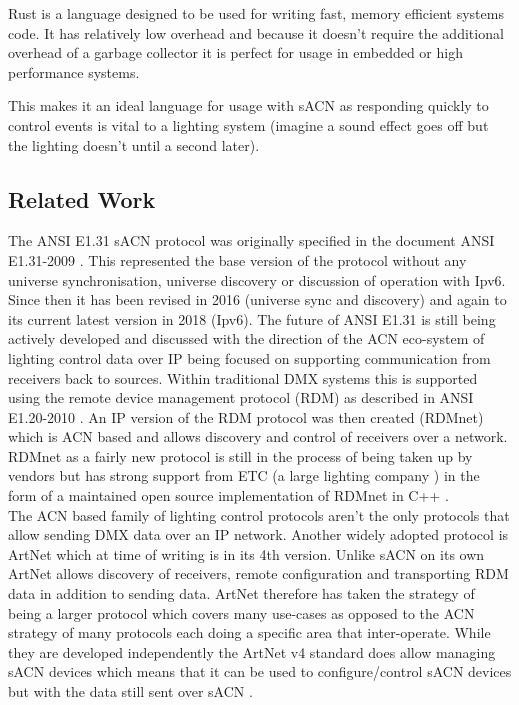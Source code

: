 \documentclass[11pt,a4paper,notitlepage]{report}
\begin{document}
	
	
	Rust \cite{RUST_LANG} is a language designed to be used for writing fast, memory efficient systems code. It has relatively low overhead and because it doesn't require the additional overhead of a garbage collector it is perfect for usage in embedded or high performance systems. 
	
	
	This makes it an ideal language for usage with sACN as responding quickly to control events is vital to a lighting system (imagine a sound effect goes off but the lighting doesn't until a second later). 
	
	\subsection{Related Work}
	The ANSI E1.31 sACN protocol was originally specified in the document ANSI E1.31-2009 \cite{ANSI_E1.31_2009}. This represented the base version of the protocol without any universe synchronisation, universe discovery or discussion of operation with Ipv6. Since then it has been revised in 2016 (universe sync and discovery) \cite{ANSI_E1.31_2016} and again to its current latest version in 2018 (Ipv6). The future of ANSI E1.31 is still being actively developed and discussed \cite{WHAT_COMES_AFTER_SACN} with the direction of the ACN eco-system of lighting control data over IP being focused on supporting communication from receivers back to sources. Within traditional DMX systems this is supported using the remote device management protocol (RDM) as described in ANSI E1.20-2010 \cite{ANSI_E1.20_2010}. An IP version of the RDM protocol was then created (RDMnet) \cite{ANSI_E1.33_2019} which is ACN based and allows discovery and control of receivers over a network. RDMnet as a fairly new protocol is still in the process of being taken up by vendors but has strong support from ETC (a large lighting company \cite{ETC}) in the form of a maintained open source implementation of RDMnet in C++ \cite{ANSI_E1.33_IMPL}.\\
	
	The ACN based family of lighting control protocols aren't the only protocols that allow sending DMX data over an IP network. Another widely adopted protocol is ArtNet which at time of writing is in its 4th version. Unlike sACN on its own ArtNet allows discovery of receivers, remote configuration and transporting RDM data \cite{ARNET} in addition to sending data. ArtNet therefore has taken the strategy of being a larger protocol which covers many use-cases as opposed to the ACN strategy of many protocols each doing a specific area that inter-operate. While they are developed independently the ArtNet v4 standard does allow managing sACN devices which means that it can be used to configure/control sACN devices but with the data still sent over sACN \cite[Pg. 3]{ARTNET}. \\
	
\end{document}
